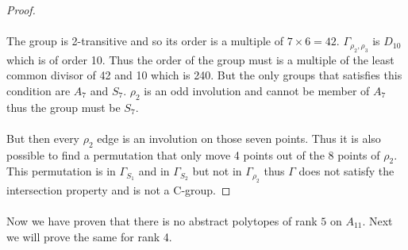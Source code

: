 \begin{proof}
  \paragraph{}
  The group is 2-transitive and so its order is a multiple of $7 \times 6 = 42$. $\Gamma_{\rho_2, \rho_3}$ is $D_{10}$ which is of order 10. Thus the order of the group must is a multiple of the least common divisor of 42 and 10 which is 240. But the only groups that satisfies this condition are $A_7$ and $S_7$. $\rho_2$ is an odd involution and cannot be member of $A_7$ thus the group must be $S_7$.

  \paragraph{}
  But then every $\rho_2$ edge is an involution on those seven points. Thus it is also possible to find a permutation that only move 4 points out of the 8 points of $\rho_2$. This permutation is in $\Gamma_{S_1}$ and in $\Gamma_{S_2}$ but not in $\Gamma_{\rho_2}$ thus $\Gamma$ does not satisfy the intersection property and is not a C-group.

\end{proof}

\paragraph{}
Now we have proven that there is no abstract polytopes of rank $5$ on $A_{11}$. Next we will prove the same for rank 4.
